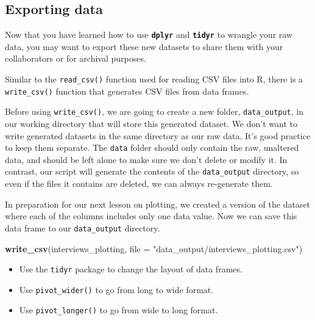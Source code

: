\documentclass[
]{article}
\newenvironment{Shaded}{\begin{snugshade}}{\end{snugshade}}
\newcommand{\AttributeTok}[1]{\textcolor[rgb]{0.13,0.29,0.53}{#1}}
\newcommand{\FunctionTok}[1]{\textcolor[rgb]{0.13,0.29,0.53}{\textbf{#1}}}
\newcommand{\NormalTok}[1]{#1}
\newcommand{\StringTok}[1]{\textcolor[rgb]{0.31,0.60,0.02}{#1}}
\providecommand{\tightlist}{%
  \setlength{\itemsep}{0pt}\setlength{\parskip}{0pt}}
\begin{document}
\subsection{Exporting data}\label{exporting-data}

Now that you have learned how to use \textbf{\texttt{dplyr}} and
\textbf{\texttt{tidyr}} to wrangle your raw data, you may want to export
these new datasets to share them with your collaborators or for archival
purposes.

Similar to the \texttt{read\_csv()} function used for reading CSV files
into R, there is a \texttt{write\_csv()} function that generates CSV
files from data frames.

Before using \texttt{write\_csv()}, we are going to create a new folder,
\texttt{data\_output}, in our working directory that will store this
generated dataset. We don't want to write generated datasets in the same
directory as our raw data. It's good practice to keep them separate. The
\texttt{data} folder should only contain the raw, unaltered data, and
should be left alone to make sure we don't delete or modify it. In
contrast, our script will generate the contents of the
\texttt{data\_output} directory, so even if the files it contains are
deleted, we can always re-generate them.

In preparation for our next lesson on plotting, we created a version of
the dataset where each of the columns includes only one data value. Now
we can save this data frame to our \texttt{data\_output} directory.

\begin{Shaded}
\begin{Highlighting}[]
\FunctionTok{write\_csv}\NormalTok{(interviews\_plotting, }\AttributeTok{file =} \StringTok{"data\_output/interviews\_plotting.csv"}\NormalTok{)}
\end{Highlighting}
\end{Shaded}

\begin{itemize}
\tightlist
\item
  Use the \texttt{tidyr} package to change the layout of data frames.
\item
  Use \texttt{pivot\_wider()} to go from long to wide format.
\item
  Use \texttt{pivot\_longer()} to go from wide to long format.
\end{itemize}
\end{document}
